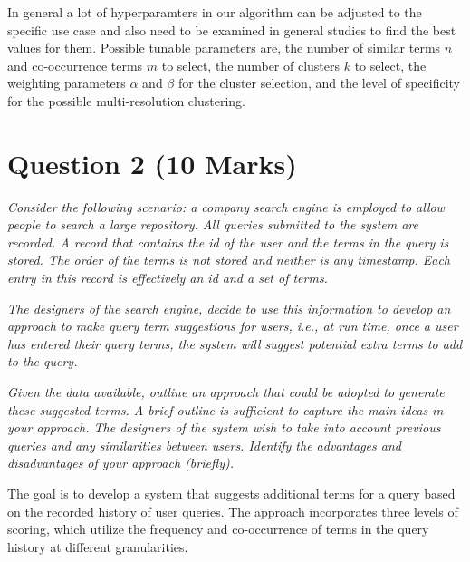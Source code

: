 In general a lot of hyperparamters in our algorithm can be adjusted to the specific use case and also need to be examined in general studies to find the best values for them. Possible tunable parameters are, the number of similar terms $n$ and co-occurrence terms $m$ to select, the number of clusters $k$ to select, the weighting parameters $\alpha$ and $\beta$ for the cluster selection, and the level of specificity for the possible multi-resolution clustering.


\newpage
\section{Question 2 (10 Marks)}

\textit{Consider the following scenario: a company search engine is employed to allow people to search a large repository. All queries submitted to the system are recorded. A record that contains the id of the user and the terms in the query is stored. The order of the terms is not stored and neither is any timestamp. Each entry in this record is effectively an id and a set of terms.}

\textit{The designers of the search engine, decide to use this information to develop an approach to make query term suggestions for users, i.e., at run time, once a user has entered their query terms, the system will suggest potential extra terms to add to the query.}

\textit{Given the data available, outline an approach that could be adopted to generate these suggested terms. A brief outline is sufficient to capture the main ideas in your approach. The designers of the system wish to take into account previous queries and any similarities between users. Identify the advantages and disadvantages of your approach (briefly).}




The goal is to develop a system that suggests additional terms for a query based on the recorded history of user queries. The approach incorporates three levels of scoring, which utilize the frequency and co-occurrence of terms in the query history at different granularities.

